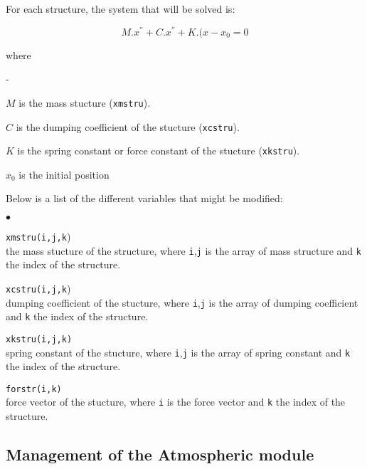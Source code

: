 {{{For each structure, the system that will be solved is:

\begin{equation}
M.x^{''}+C.x^{''}+K.(x-x_{0} = 0
\end{equation}

where

\begin{list}{-}{}
 \item $M$ is the mass stucture (\texttt{xmstru}).
 \item $C$ is the dumping coefficient of the stucture (\texttt{xcstru}).
 \item $K$ is the spring constant or force constant of the stucture (\texttt{xkstru}).
 \item $x_{0}$ is the initial position
\end{list}

Below is a list of the different variables that might be modified:

\begin{list}{$\bullet$}{}

\item{\texttt{xmstru(i,j,k})} \\
{the mass stucture of the structure, where \texttt{i},\texttt{j} is
the array of mass structure and \texttt{k} the index of the structure.}

\item{\texttt{xcstru(i,j,k})}\\
{dumping coefficient of the stucture, where \texttt{i},\texttt{j} is the array of
dumping coefficient and \texttt{k} the index of the structure.}

\item{\texttt{xkstru(i,j,k)}}\\
{spring constant of the stucture, where \texttt{i},\texttt{j} is the array of spring
constant and \texttt{k} the index of the structure.}

\item{\texttt{forstr(i,k)}}\\
{force vector of the stucture, where \texttt{i} is the force vector and
\texttt{k} the index of the structure.}
\end{list}

\subsection{Management of the Atmospheric module}
}}}

